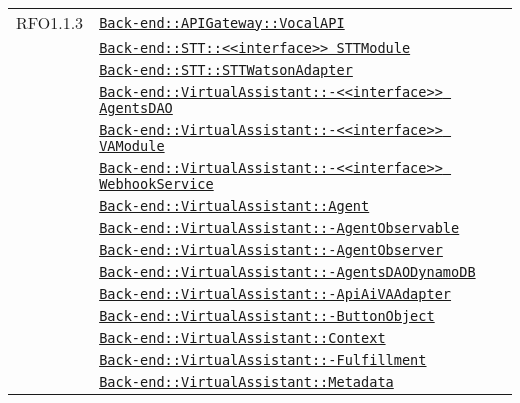 \begin{longtable}{|>{\centering}m{3cm}|m{10cm}<{\centering}|}
RFO1.1.3 & \hyperref[Back-end::APIGateway::VocalAPI]{\texttt{Back-end::APIGateway::VocalAPI}}\\
& \hyperref[Back-end::STT::<<interface>> STTModule]{\texttt{Back-end::STT::<<interface>> STTModule}}\\
& \hyperref[Back-end::STT::STTWatsonAdapter]{\texttt{Back-end::STT::STTWatsonAdapter}}\\
& \hyperref[Back-end::VirtualAssistant::<<interface>> AgentsDAO]{\texttt{Back-end::VirtualAssistant::-\linebreak <<interface>> AgentsDAO}}\\
& \hyperref[Back-end::VirtualAssistant::<<interface>> VAModule]{\texttt{Back-end::VirtualAssistant::-\linebreak <<interface>> VAModule}}\\
& \hyperref[Back-end::VirtualAssistant::<<interface>> WebhookService]{\texttt{Back-end::VirtualAssistant::-\linebreak <<interface>> WebhookService}}\\
& \hyperref[Back-end::VirtualAssistant::Agent]{\texttt{Back-end::VirtualAssistant::Agent}}\\
& \hyperref[Back-end::VirtualAssistant::AgentObservable]{\texttt{Back-end::VirtualAssistant::-\linebreak AgentObservable}}\\
& \hyperref[Back-end::VirtualAssistant::AgentObserver]{\texttt{Back-end::VirtualAssistant::-\linebreak AgentObserver}}\\
& \hyperref[Back-end::VirtualAssistant::AgentsDAODynamoDB]{\texttt{Back-end::VirtualAssistant::-\linebreak AgentsDAODynamoDB}}\\
& \hyperref[Back-end::VirtualAssistant::ApiAiVAAdapter]{\texttt{Back-end::VirtualAssistant::-\linebreak ApiAiVAAdapter}}\\
& \hyperref[Back-end::VirtualAssistant::ButtonObject]{\texttt{Back-end::VirtualAssistant::-\linebreak ButtonObject}}\\
& \hyperref[Back-end::VirtualAssistant::Context]{\texttt{Back-end::VirtualAssistant::Context}}\\
& \hyperref[Back-end::VirtualAssistant::Fulfillment]{\texttt{Back-end::VirtualAssistant::-\linebreak Fulfillment}}\\
& \hyperref[Back-end::VirtualAssistant::Metadata]{\texttt{Back-end::VirtualAssistant::Metadata}}\\

\end{longtable}
